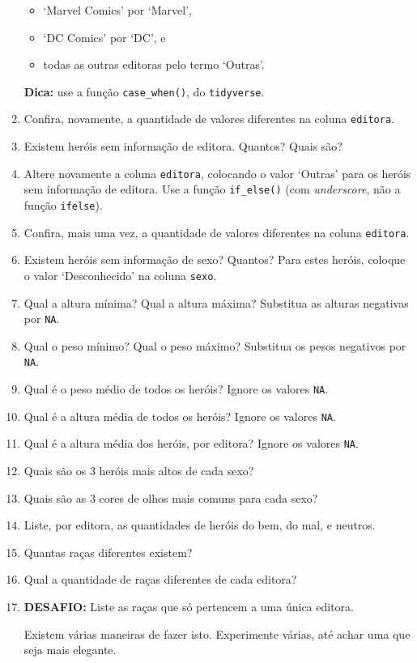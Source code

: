 \documentclass[
  11pt]{report}
\providecommand{\tightlist}{%
  \setlength{\itemsep}{0pt}\setlength{\parskip}{0pt}}
\begin{document}
\begin{enumerate}
  \begin{itemize}
  \tightlist
  \item
    `Marvel Comics' por `Marvel',
  \item
    `DC Comics' por `DC', e
  \item
    todas as outras editoras pelo termo `Outras'.
  \end{itemize}

  \textbf{Dica:} use a função \texttt{case\_when()}, do \texttt{tidyverse}.
\item
  Confira, novamente, a quantidade de valores diferentes na coluna \texttt{editora}.
\item
  Existem heróis sem informação de editora. Quantos? Quais são?
\item
  Altere novamente a coluna \texttt{editora}, colocando o valor `Outras' para os heróis sem informação de editora. Use a função \texttt{if\_else()} (com \emph{underscore}, não a função \texttt{ifelse}).
\item
  Confira, mais uma vez, a quantidade de valores diferentes na coluna \texttt{editora}.
\item
  Existem heróis sem informação de sexo? Quantos? Para estes heróis, coloque o valor `Desconhecido' na coluna \texttt{sexo}.
\item
  Qual a altura mínima? Qual a altura máxima? Substitua as alturas negativas por \texttt{NA}.
\item
  Qual o peso mínimo? Qual o peso máximo? Substitua os pesos negativos por \texttt{NA}.
\item
  Qual é o peso médio de todos os heróis? Ignore os valores \texttt{NA}.
\item
  Qual é a altura média de todos os heróis? Ignore os valores \texttt{NA}.
\item
  Qual é a altura média dos heróis, por editora? Ignore os valores \texttt{NA}.
\item
  Quais são os $3$ heróis mais altos de cada sexo?
\item
  Quais são as $3$ cores de olhos mais comuns para cada sexo?
\item
  Liste, por editora, as quantidades de heróis do bem, do mal, e neutros.
\item
  Quantas raças diferentes existem?
\item
  Qual a quantidade de raças diferentes de cada editora?
\item
  \textbf{DESAFIO:} Liste as raças que só pertencem a uma única editora.

  Existem várias maneiras de fazer isto. Experimente várias, até achar uma que seja mais elegante.
\end{enumerate}
\end{document}
